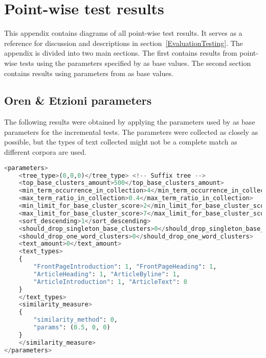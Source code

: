 
\chapter{Point-wise test results} %

\label{AppendixA} %


This appendix contains diagrams of all point-wise test results. It serves as a reference for discussion and descriptions in section~\ref{EvaluationTesting}. The appendix is divided into two main sections. The first contains results from point-wise tests using the parameters specified by \citeauthor{Oren1998} as base values. The second section contains results using parameters from \citeauthor{Moe2013compact} as base values.

\section{Oren \& Etzioni parameters}

The following results were obtained by applying the parameters used by \citeauthor{Oren1998} as base parameters for the incremental tests. The parameters were collected as closely as possible, but the types of text collected might not be a complete match as different corpora are used.

\begin{lstlisting}[float=t, language=python, label=lst:etzioniparams, caption={Parameter set used in Oren and Etzioni.}]
<parameters>
    <tree_type>(0,0,0)</tree_type> <!-- Suffix tree -->
    <top_base_clusters_amount>500</top_base_clusters_amount>
    <min_term_occurrence_in_collection>4</min_term_occurrence_in_collection>
    <max_term_ratio_in_collection>0.4</max_term_ratio_in_collection>
    <min_limit_for_base_cluster_score>2</min_limit_for_base_cluster_score>
    <max_limit_for_base_cluster_score>7</max_limit_for_base_cluster_score>
    <sort_descending>1</sort_descending>
    <should_drop_singleton_base_clusters>0</should_drop_singleton_base_clusters>
    <should_drop_one_word_clusters>0</should_drop_one_word_clusters>
    <text_amount>0</text_amount>
    <text_types>
    {
    	"FrontPageIntroduction": 1, "FrontPageHeading": 1,
    	"ArticleHeading": 1, "ArticleByline": 1,
    	"ArticleIntroduction": 1, "ArticleText": 0
    }
    </text_types>
    <similarity_measure>
    {
    	"similarity_method": 0,
    	"params": (0.5, 0, 0)
    }
   	</similarity_measure>
</parameters>
\end{lstlisting}

